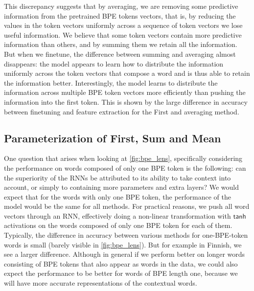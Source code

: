 \documentclass[11pt]{article}
\begin{document}
                This discrepancy suggests that by averaging, we are
     removing some predictive information from the pretrained BPE
     tokens vectors, that is, by reducing the values in the token vectors
     uniformly across a sequence of token vectors we lose useful
     information.
        We believe that some token vectors contain more predictive
     information than others, and by summing them we retain all the
     information.
                         But when we finetune, the difference between
     summing and averaging almost disappears: the model appears to
     learn how to distribute the information uniformly across the
     token vectors that compose a word and is thus able to retain the
     information better. Interestingly, the model learns to distribute
     the information across multiple BPE token vectors more
     efficiently than pushing the information into the first
     token. This is shown by the large difference in accuracy between
     finetuning and feature extraction for the First and averaging
     method.


    \subsection{Parameterization of First, Sum and Mean}

            One question that arises when looking at
     \cref{fig:bpe_lens}, specifically considering the performance on
     words composed of only one BPE token is the following: can the
     superiority of the RNNs be attributed to its ability to take
     context into account, or simply to containing more parameters
     and extra layers?
         We would expect that for the words with only one BPE token,
     the performance of the model would be the same for all
     methods. For practical reasons, we push all word vectors
     through an RNN, effectively doing a non-linear transformation
     with $\mathsf{tanh}$ activations on the words composed of only
     one BPE token for each of them.
                Typically, the difference in accuracy between various
     methods for one-BPE-token words is small (barely visible in
     \cref{fig:bpe_lens}). But for example in Finnish, we see a larger
     difference. Although in general if we perform better on longer
     words consisting of BPE tokens that also appear as words in the
     data, we could also expect the performance to be better for
     words of BPE length one, because we will have more accurate
     representations of the contextual words.
\end{document}
